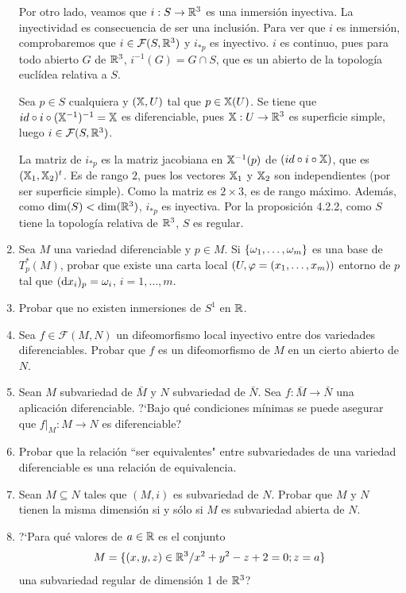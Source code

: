 \documentclass[Cursovd_portada.tex]{subfiles}
\begin{document}
\begin{enumerate}
\begin{dem}
Por otro lado, veamos que $i : S \to \mathbb{R}^3$ es una inmersión inyectiva. La inyectividad es consecuencia de ser una inclusión. Para ver que $i$ es inmersión, comprobaremos que $i \in \mathcal{F}(S,\mathbb{R}^3)$ y $i_{*p}$ es inyectivo. $i$ es continuo, pues para todo abierto $G$ de $\mathbb{R}^3$, $i^{-1}(G) = G \cap S$, que es un abierto de la topología euclídea relativa a $S$.

Sea $p \in S$ cualquiera y $(\mathbb{X},U)$ tal que $p \in \mathbb{X}(U)$.
Se tiene que $id \circ i \circ (\mathbb{X}^{-1})^{-1} = \mathbb{X}$ es diferenciable, pues $\mathbb{X} : U \to \mathbb{R}^3$ es superficie simple, luego $i \in \mathcal{F}(S,\mathbb{R}^3)$.

La matriz de $i_{*p}$ es la matriz jacobiana en $\mathbb{X}^{-1}(p)$ de $(id \circ i \circ \mathbb{X})$, que es $(\mathbb{X}_1, \mathbb{X}_2)^t$. Es de rango $2$, pues los vectores $\mathbb{X}_1$ y $\mathbb{X}_2$ son independientes (por ser superficie simple). Como la matriz es $2\times 3$, es de rango máximo. Además, como $\dim(S) < \dim(\mathbb{R}^3)$, $i_{*p}$ es inyectiva. Por la proposición 4.2.2, como $S$ tiene la topología relativa de $\mathbb{R}^3$, $S$ es regular.
\end{dem}

\item Sea $M$ una variedad diferenciable y $p\in M$. Si
$\{\omega_1,\dots ,\omega_m\}$ es una base de $T_p^*(M)$, probar que
existe una carta local $(U,\varphi=(x_1,\dots ,x_m))$ entorno de $p$
tal que $({\rm d} x_i)_p=\omega_i$, $i=1,\dots ,m$. \item Probar que
no existen inmersiones de $S^1$ en $\mathbb{R}$.

\item Sea $f\in\mathcal{F}(M,N)$ un difeomorfismo local inyectivo entre dos
variedades diferenciables. Probar que $f$ es un difeomorfismo de
$M$ en un cierto abierto de $N$. \item Sean $M$ subvariedad de
$\bar{M}$ y $N$ subvariedad de $\bar{N}$. Sea $f: \bar{M}
\longrightarrow \bar{N}$ una aplicación diferenciable. ?`Bajo
qué condiciones mínimas se puede asegurar que $f|_M:M
\longrightarrow N$ es diferenciable? \item Probar que la
relación ``ser equivalentes" entre subvariedades de una
variedad diferenciable es una relación de equivalencia.
\item Sean $M\subseteq N$ tales que $(M,i)$ es subvariedad de $N$. Probar que $M$ y $N$ tienen la misma dimensión si y sólo si $M$ es subvariedad abierta de $N$.
\item
?`Para qué valores de $a\in\mathbb{R}$ es el conjunto
$$M=\{(x,y,z)\in\mathbb{R}^3/x^2+y^2-z+2=0;z=a\}$$
una subvariedad regular de dimensión 1 de $\mathbb{R}^3$?
\end{enumerate}
\end{document}
